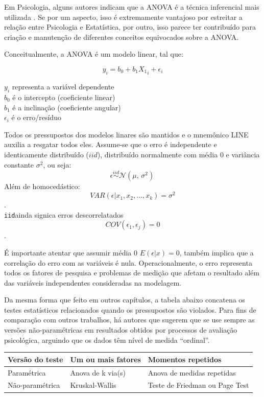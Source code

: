\documentclass[
]{book}
\begin{document}
Em Psicologia, alguns autores indicam que a ANOVA é a técnica inferencial mais utilizada \citep{Chartier2008, Howell2011}. Se por um aspecto, isso é extremamente vantajoso por estreitar a relação entre Psicologia e Estatística, por outro, isso parece ter contribuído para criação e manutenção de diferentes conceitos equivocados sobre a ANOVA.

Conceitualmente, a ANOVA é um modelo linear, tal que:

\[y_i = b_0 + b_1X{_1}_i + \epsilon_{i}\]

\(y_i\) representa a variável dependente\\
\(b_0\) é o intercepto (coeficiente linear)\\
\(b_1\) é a inclinação (coeficiente angular)\\
\(\epsilon_{i}\) é o erro/resíduo

Todos os pressupostos dos modelos linares são mantidos e o mnemônico LINE auxilia a resgatar todos eles. Assume-se que o erro é independente e identicamente distribuído (\(iid\)), distribuído normalmente com média 0 e variância constante \(\sigma^2\), ou seja: \[ \epsilon\stackrel{iid}{\sim} \mathcal{N}(\mu,\,\sigma^{2})\,\] Além de homocedástico: \[ VAR(\epsilon |x_1,x_2,...,x_k)=\sigma^2 \].\\
\texttt{iid}ainda signica erros descorrelatados \[ COV(\epsilon_1,\epsilon_j)=0 \].

É importante atentar que assumir média 0 \(E(\epsilon|x)=0\), também implica que a correlação do erro com as variáveis é nula. Operacionalmente, o erro representa todos os fatores de pesquisa e problemas de medição que afetam o resultado além das variáveis independentes consideradas na modelagem.

Da mesma forma que feito em outros capítulos, a tabela abaixo concatena os testes estatísticos relacionados quando os pressupostos são violados. Para fins de comparação com outros trabalhos, há autores que sugerem que se use sempre as versões não-paramétricas em resultados obtidos por processos de avaliação psicológica, arguindo que os dados têm nível de medida ``ordinal''.

\begin{longtable}[]{@{}lll@{}}
\toprule
Versão do teste & Um ou mais fatores & Momentos repetidos\tabularnewline
\midrule
\endhead
Paramétrica & Anova de k via(s) & Anova de medidas repetidas\tabularnewline
Não-paramétrica & Kruskal-Wallis & Teste de Friedman ou Page Test\tabularnewline
\bottomrule
\end{longtable}
\end{document}
